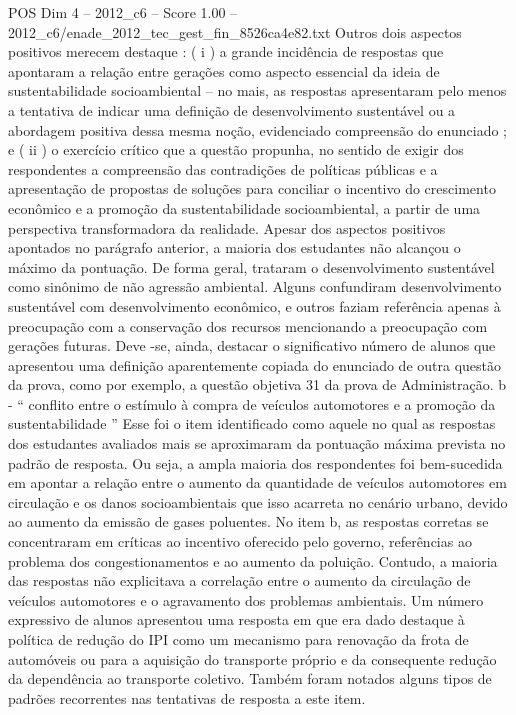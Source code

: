 \begin{textsample}{POS Dim 4 – 2012\_c6 – Score 1.00 – 2012\_c6/enade\_2012\_tec\_gest\_fin\_8526ca4e82.txt}
Outros dois aspectos positivos merecem destaque : ( i ) a grande incidência de respostas que apontaram a relação entre gerações como aspecto essencial da ideia de sustentabilidade socioambiental – no mais, as respostas apresentaram pelo menos a tentativa de indicar uma definição de desenvolvimento sustentável ou a abordagem positiva dessa mesma noção, evidenciado compreensão do enunciado ; e ( ii ) o exercício crítico que a questão propunha, no sentido de exigir dos respondentes a compreensão das contradições de políticas públicas e a apresentação de propostas de soluções para conciliar o incentivo do crescimento econômico e a promoção da sustentabilidade socioambiental, a partir de uma perspectiva transformadora da realidade.
Apesar dos aspectos positivos apontados no parágrafo anterior, a maioria dos estudantes não alcançou o máximo da pontuação.
De forma geral, trataram o desenvolvimento sustentável como sinônimo de não agressão ambiental.
Alguns confundiram desenvolvimento sustentável com desenvolvimento econômico, e outros faziam referência apenas à preocupação com a conservação dos recursos mencionando a preocupação com gerações futuras.
Deve -se, ainda, destacar o significativo número de alunos que apresentou uma definição aparentemente copiada do enunciado de outra questão da prova, como por exemplo, a questão objetiva 31 da prova de Administração. b - “ conflito entre o estímulo à compra de veículos automotores e a promoção da sustentabilidade ” Esse foi o item identificado como aquele no qual as respostas dos estudantes avaliados mais se aproximaram da pontuação máxima prevista no padrão de resposta.
Ou seja, a ampla maioria dos respondentes foi bem-sucedida em apontar a relação entre o aumento da quantidade de veículos automotores em circulação e os danos socioambientais que isso acarreta no cenário urbano, devido ao aumento da emissão de gases poluentes.
No item b, as respostas corretas se concentraram em críticas ao incentivo oferecido pelo governo, referências ao problema dos congestionamentos e ao aumento da poluição.
Contudo, a maioria das respostas não explicitava a correlação entre o aumento da circulação de veículos automotores e o agravamento dos problemas ambientais.
Um número expressivo de alunos apresentou uma resposta em que era dado destaque à política de redução do IPI como um mecanismo para renovação da frota de automóveis ou para a aquisição do transporte próprio e da consequente redução da dependência ao transporte coletivo.
Também foram notados alguns tipos de padrões recorrentes nas tentativas de resposta a este item.

\end{textsample}
